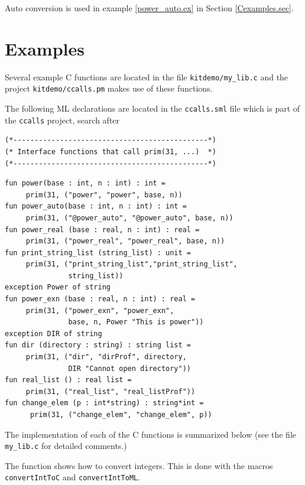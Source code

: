 \documentclass[12pt]{book}
\begin{document}
Auto conversion is used in example \ref{power_auto.ex} in Section
\ref{Cexamples.sec}.

\section{Examples\label{Cexamples.sec}}
 
 Several example C functions are
located in the file \mbox{\texttt{kitdemo/my\_lib.c}} and the project
{\tt kitdemo/ccalls.pm} makes use of these functions.

The following ML declarations are located in the {\tt ccalls.sml} file
which is part of the {\tt ccalls} project, search after

\begin{verbatim}
(*----------------------------------------------*)
(* Interface functions that call prim(31, ...)  *)
(*----------------------------------------------*)
\end{verbatim}

\begin{verbatim}
fun power(base : int, n : int) : int = 
     prim(31, ("power", "power", base, n))
fun power_auto(base : int, n : int) : int = 
     prim(31, ("@power_auto", "@power_auto", base, n))
fun power_real (base : real, n : int) : real = 
     prim(31, ("power_real", "power_real", base, n))
fun print_string_list (string_list) : unit = 
     prim(31, ("print_string_list","print_string_list", 
               string_list))
exception Power of string
fun power_exn (base : real, n : int) : real = 
     prim(31, ("power_exn", "power_exn", 
               base, n, Power "This is power"))
exception DIR of string
fun dir (directory : string) : string list = 
     prim(31, ("dir", "dirProf", directory, 
               DIR "Cannot open directory"))
fun real_list () : real list = 
     prim(31, ("real_list", "real_listProf"))
fun change_elem (p : int*string) : string*int =
      prim(31, ("change_elem", "change_elem", p))
\end{verbatim}

The implementation of each of the C functions is summarized below (see
the file {\tt my\_lib.c} for detailed comments.)

\begin{example}\label{power.ex}
  The  function shows how to convert integers. This is done
  with the macros \texttt{convertIntToC} and \texttt{convertIntToML}.
\end{example}
\end{document}
